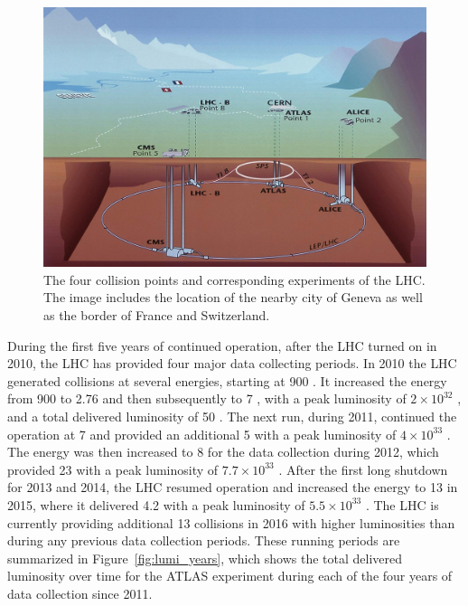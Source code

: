 \begin{figure}
\centering
\includegraphics[width=\fullfig]{figures/cern_locations.jpg}
\caption{The four collision points and corresponding experiments of the \ac{LHC}. The image includes the location of the nearby city of Geneva as well as the border of France and Switzerland.}
\label{fig:cern_locations}
\end{figure}

During the first five years of continued operation, after the \ac{LHC} turned on in 2010, the \ac{LHC} has provided four major data collecting periods.
In 2010 the \ac{LHC} generated collisions at several energies, starting at 900 \GeV. 
It increased the energy from 900 \GeV to 2.76 \TeV and then subsequently to 7 \TeV, with a peak luminosity of $2 \times 10^{32}$ \lcms, and a total delivered luminosity of 50 \ipb.
The next run, during 2011, continued the operation at 7 \TeV and provided an additional 5 \ifb with a peak luminosity of $4 \times 10^{33}$ \lcms. 
The energy was then increased to 8 \TeV for the data collection during 2012, which provided 23 \ifb with a peak luminosity of $7.7 \times 10^{33}$ \lcms.
After the first long shutdown for 2013 and 2014, the \ac{LHC} resumed operation and increased the energy to 13 \TeV in 2015, where it delivered 4.2 \ifb with a peak luminosity of $5.5 \times 10^{33}$ \lcms. 
The \ac{LHC} is currently providing additional 13 \TeV collisions in 2016 with higher luminosities than during any previous data collection periods.
These running periods are summarized in Figure~\ref{fig:lumi_years}, which shows the total delivered luminosity over time for the ATLAS experiment during each of the four years of data collection since 2011.

